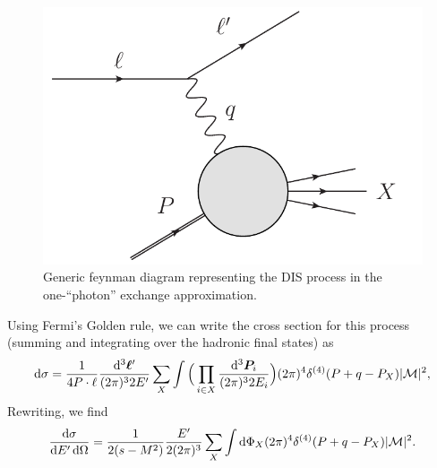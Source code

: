 \documentclass[aps,prd,amsmath,superscriptaddress,floatfix,nofootinbib]{revtex4-2}
\newcommand{\diff}[1]{{\rm d} #1}
\begin{document}
\begin{figure}[h!b]
\begin{center}
    \includegraphics[width=0.5\paperwidth]{./figures/DIS_generic.pdf}
    \caption{Generic feynman diagram representing the DIS process in the one-``photon'' exchange approximation.}
    \label{fig:DIS-one-photon}
\end{center}
\end{figure}

Using Fermi's Golden rule, we can write the cross section for this process (summing and integrating over the hadronic final states) as
\begin{eqnarray}
    \label{eq:xsec-general}
    \diff \sigma = \frac{1}{4 P \cdot \ell} \frac{\diff^3 {\bm \ell'}}{(2\pi)^{3} 2E'} \sum_{X} \int \Big( \prod_{i \in X} \frac{\diff^3 {\bm P_{i}}}{(2\pi)^3 2E_{i}} \Big) (2\pi)^{4} \delta^{(4)}(P + q - P_{X}) |{\cal M}|^2 
,\end{eqnarray}
Rewriting, we find
\begin{eqnarray}
    \label{eq:xsec-rewritten}
    \frac{\diff \sigma}{\diff E' \, \diff \Omega} = \frac{1}{2(s-M^2)} \frac{E'}{2(2\pi)^3} \sum_{X} \int \diff \Phi_{X} (2\pi)^{4} \delta^{(4)}(P+q-P_{X}) |{\cal M}|^2
.\end{eqnarray}
\end{document}
